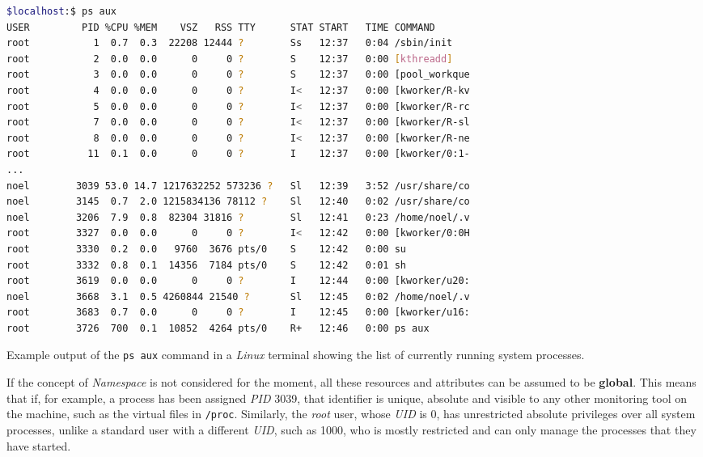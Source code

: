 \begin{code}[h!]
\begin{lstlisting}[language=bash]
$localhost:$ ps aux
USER         PID %CPU %MEM    VSZ   RSS TTY      STAT START   TIME COMMAND
root           1  0.7  0.3  22208 12444 ?        Ss   12:37   0:04 /sbin/init
root           2  0.0  0.0      0     0 ?        S    12:37   0:00 [kthreadd]
root           3  0.0  0.0      0     0 ?        S    12:37   0:00 [pool_workque
root           4  0.0  0.0      0     0 ?        I<   12:37   0:00 [kworker/R-kv
root           5  0.0  0.0      0     0 ?        I<   12:37   0:00 [kworker/R-rc
root           7  0.0  0.0      0     0 ?        I<   12:37   0:00 [kworker/R-sl
root           8  0.0  0.0      0     0 ?        I<   12:37   0:00 [kworker/R-ne
root          11  0.1  0.0      0     0 ?        I    12:37   0:00 [kworker/0:1-
...
noel        3039 53.0 14.7 1217632252 573236 ?   Sl   12:39   3:52 /usr/share/co
noel        3145  0.7  2.0 1215834136 78112 ?    Sl   12:40   0:02 /usr/share/co
noel        3206  7.9  0.8  82304 31816 ?        Sl   12:41   0:23 /home/noel/.v
root        3327  0.0  0.0      0     0 ?        I<   12:42   0:00 [kworker/0:0H
root        3330  0.2  0.0   9760  3676 pts/0    S    12:42   0:00 su
root        3332  0.8  0.1  14356  7184 pts/0    S    12:42   0:01 sh
root        3619  0.0  0.0      0     0 ?        I    12:44   0:00 [kworker/u20:
noel        3668  3.1  0.5 4260844 21540 ?       Sl   12:45   0:02 /home/noel/.v
root        3683  0.7  0.0      0     0 ?        I    12:45   0:00 [kworker/u16:
root        3726  700  0.1  10852  4264 pts/0    R+   12:46   0:00 ps aux
\end{lstlisting}
\caption[Example output of the \texttt{ps aux} command in a Linux terminal.]{Example output of the \texttt{ps aux} command in a \textit{Linux} terminal showing the list of currently running system processes.}
\label{cod:ps_aux}
\end{code}

If the concept of \textit{Namespace} is not considered for the moment, all these resources and attributes can be assumed to be \textbf{global}.
This means that if, for example, a process has been assigned \textit{PID} 3039, that identifier is unique, absolute and visible to any other monitoring tool on the machine, such as the virtual files in \texttt{/proc}.
Similarly, the \textit{root} user, whose \textit{UID} is 0, has unrestricted absolute privileges over all system processes,
unlike a standard user with a different \textit{UID}, such as 1000, who is mostly restricted and can only manage the processes that they have started.\\

